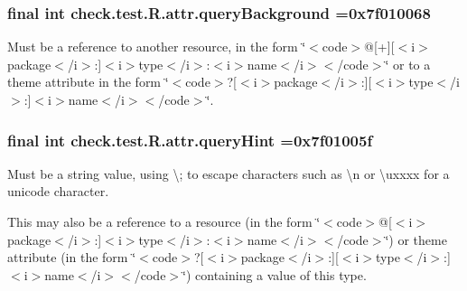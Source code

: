 \subsubsection[{query\+Background}]{\setlength{\rightskip}{0pt plus 5cm}final int check.\+test.\+R.\+attr.\+query\+Background =0x7f010068\hspace{0.3cm}{\ttfamily [static]}}\label{classcheck_1_1test_1_1_r_1_1attr_af0a91bf09811eeb964bf4bbeda503819}
Must be a reference to another resource, in the form \char`\"{}$<$code$>$@\mbox{[}+\mbox{]}\mbox{[}$<$i$>$package$<$/i$>$\+:\mbox{]}$<$i$>$type$<$/i$>$\+:$<$i$>$name$<$/i$>$$<$/code$>$\char`\"{} or to a theme attribute in the form \char`\"{}$<$code$>$?\mbox{[}$<$i$>$package$<$/i$>$\+:\mbox{]}\mbox{[}$<$i$>$type$<$/i$>$\+:\mbox{]}$<$i$>$name$<$/i$>$$<$/code$>$\char`\"{}. \hypertarget{classcheck_1_1test_1_1_r_1_1attr_a6be50aa8a3f5405bbcce9d6d866f3b97}{}
\subsubsection[{query\+Hint}]{\setlength{\rightskip}{0pt plus 5cm}final int check.\+test.\+R.\+attr.\+query\+Hint =0x7f01005f\hspace{0.3cm}{\ttfamily [static]}}\label{classcheck_1_1test_1_1_r_1_1attr_a6be50aa8a3f5405bbcce9d6d866f3b97}
Must be a string value, using \textquotesingle{}\textbackslash{};\textquotesingle{} to escape characters such as \textquotesingle{}\textbackslash{}n\textquotesingle{} or \textquotesingle{}\textbackslash{}uxxxx\textquotesingle{} for a unicode character. 

This may also be a reference to a resource (in the form \char`\"{}$<$code$>$@\mbox{[}$<$i$>$package$<$/i$>$\+:\mbox{]}$<$i$>$type$<$/i$>$\+:$<$i$>$name$<$/i$>$$<$/code$>$\char`\"{}) or theme attribute (in the form \char`\"{}$<$code$>$?\mbox{[}$<$i$>$package$<$/i$>$\+:\mbox{]}\mbox{[}$<$i$>$type$<$/i$>$\+:\mbox{]}$<$i$>$name$<$/i$>$$<$/code$>$\char`\"{}) containing a value of this type. \hypertarget{classcheck_1_1test_1_1_r_1_1attr_a9fbb336c43ad1f66e9f652efbc698b91}{}
